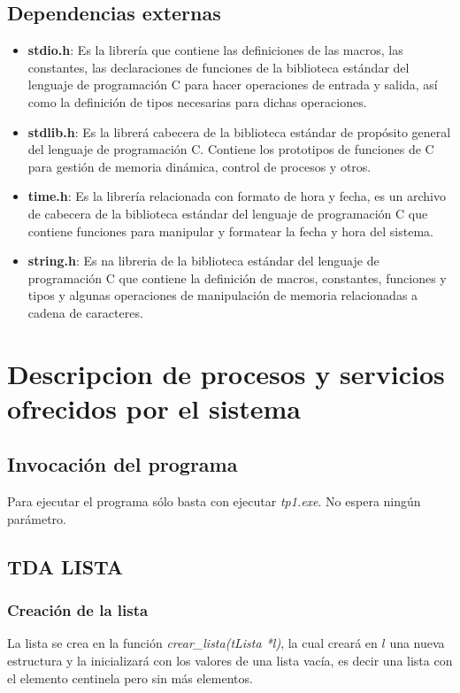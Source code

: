\documentclass[12pt,a4paper]{article}
\begin{document}
\subsection{Dependencias externas}
\begin{itemize}
    \item {\bf stdio.h}: Es la librer\'ia que contiene las definiciones de las macros, las constantes, las declaraciones de funciones de la biblioteca est\'andar del lenguaje de programaci\'on C para hacer operaciones de entrada y salida, as\'i como la definici\'on de tipos necesarias para dichas operaciones.
    \item {\bf stdlib.h}: Es la librer\'a cabecera de la biblioteca est\'andar de prop\'osito general del lenguaje de programaci\'on C. Contiene los prototipos de funciones de C para gesti\'on de memoria din\'amica, control de procesos y otros.
    \item {\bf time.h}: Es la librer\'ia relacionada con formato de hora y fecha, es un archivo de cabecera de la biblioteca est\'andar del lenguaje de programaci\'on C que contiene funciones para manipular y formatear la fecha y hora del sistema.
    \item {\bf string.h}: Es na libreria de la biblioteca est\'andar del lenguaje de programaci\'on C que contiene la definici\'on de macros, constantes, funciones y tipos y algunas operaciones de manipulaci\'on de memoria relacionadas a cadena de caracteres.
\end{itemize}

\section{Descripcion de procesos y servicios ofrecidos por el sistema}
\subsection{Invocaci\'on del programa}
Para ejecutar el programa s\'olo basta con ejecutar \emph{tp1.exe}. No espera ning\'un par\'ametro.

\subsection{TDA LISTA}
\subsubsection{Creaci\'on de la lista}
La lista se crea en la funci\'on \emph{crear\_lista(tLista *l)}, la cual crear\'a en $l$ una nueva estructura y la inicializar\'a con los valores de una lista vac\'ia, es decir una lista con el elemento centinela pero sin m\'as elementos.
\end{document}
